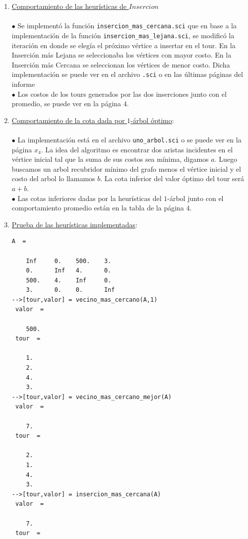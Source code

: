 \documentclass[10pt,a4paper]{report}
\begin{document}
\begin{enumerate}
\item \underline{Comportamiento de las heur\'isticas de $Insercion$}\\\\
$\bullet$ Se implement\'o la funci\'on \texttt{insercion\_mas\_cercana.sci} que en base a la implementaci\'on de la funci\'on \texttt{insercion\_mas\_lejana.sci}, se modific\'o la iteraci\'on en donde se eleg\'ia el pr\'oximo v\'ertice a insertar en el tour. En la Inserci\'on m\'as Lejana se seleccionaba los v\'ertices con mayor costo. En la Inserci\'on m\'as Cercana se seleccionan los v\'ertices de menor costo. Dicha implementaci\'on se puede ver en el archivo \texttt{.sci} o en las \'ultimas p\'aginas del informe\\
$\bullet$ Los costos de los tours generados por las dos inserciones junto con el promedio, se puede ver en la p\'agina $4$.
\item \underline{Comportamiento de la cota dada por $1$-\'arbol \'optimo}:\\\\
$\bullet$  La implementaci\'on est\'a en el archivo \texttt{uno\_arbol.sci} o se puede ver en la p\'agina $x_4$. La idea del algoritmo es encontrar dos aristas incidentes en el v\'ertice inicial tal que la suma de sus costos sea m\'inima, digamos $a$. Luego buscamos un arbol recubridor m\'inimo del grafo menos el v\'ertice inicial y el costo del arbol lo llamamos $b$. La cota inferior del valor \'optimo del tour ser\'a $a+b$.\\
$\bullet$ Las cotas inferiores dadas por la heur\'isticas del $1$-\'arbol junto con el comportamiento promedio est\'an en la tabla de la p\'agina $4$.
\item \underline{Prueba de las heur\'isticas implementadas}:\\
\begin{lstlisting}[frame=single]
A  =
 
    Inf     0.    500.    3.  
    0.      Inf   4.      0.  
    500.    4.    Inf     0.  
    3.      0.    0.      Inf 
-->[tour,valor] = vecino_mas_cercano(A,1)
 valor  =
 
    500.  
 tour  =
 
    1.  
    2.  
    4.  
    3.
-->[tour,valor] = vecino_mas_cercano_mejor(A)
 valor  =
 
    7.  
 tour  =
 
    2.  
    1.  
    4.  
    3.  
-->[tour,valor] = insercion_mas_cercana(A)
 valor  =
 
    7.  
 tour  =
 

\end{lstlisting}
\end{enumerate}
\end{document}
